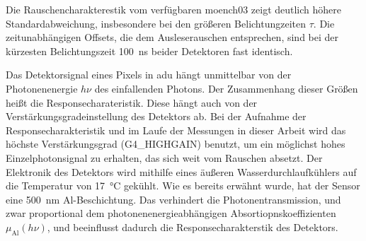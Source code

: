 \noindent
Die Rauschencharakterestik vom verfügbaren \gls{moench03} zeigt deutlich höhere Standardabweichung, insbesondere bei den größeren Belichtungzeiten $\tau$. Die zeitunabhängigen Offsets, die dem Ausleserauschen entsprechen, sind bei der kürzesten Belichtungszeit \SI{100}{\nano\second} beider Detektoren fast identisch.

\noindent
Das Detektorsignal eines Pixels in \gls{adu} hängt unmittelbar von der Photonenenergie $h\nu$ des einfallenden Photons. Der Zusammenhang dieser Größen heißt die Responsecharateristik. Diese hängt auch von der Verstärkungsgradeinstellung des Detektors ab. Bei der Aufnahme der Responsecharakteristik und im Laufe der Messungen in dieser Arbeit wird das höchste Verstärkungsgrad (G4\_HIGHGAIN) benutzt, um ein möglichst hohes Einzelphotonsignal zu erhalten, das sich weit vom Rauschen absetzt. Der Elektronik des Detektors wird mithilfe eines äußeren Wasserdurchlaufkühlers auf die Temperatur von \SI{17}{\celsius} gekühlt. Wie es bereits erwähnt wurde, hat der Sensor eine \SI{500}{\nano\meter} Al-Beschichtung. Das verhindert die Photonentransmission, und zwar proportional dem photonenenergieabhängigen Absortiopnskoeffizienten $\mu_\text{Al}(h\nu)$, und beeinflusst dadurch die Responsecharakterstik des Detektors.
%     

